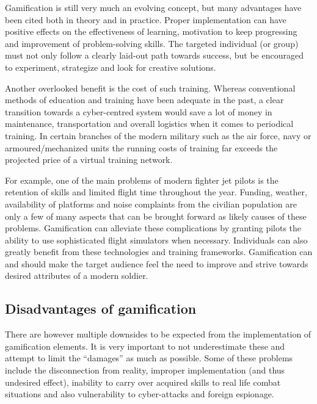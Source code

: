 \documentclass[10pt,twoside,slovak,a4paper]{article}
\begin{document}
Gamification is still very much an evolving concept, but many advantages have been cited both in theory and in practice. Proper implementation can have positive effects on the effectiveness of learning, motivation to keep progressing and improvement of problem-solving skills. The targeted individual (or group) must not only follow a clearly laid-out path towards success, but be encouraged to experiment, strategize and look for creative solutions\cite{tomcho2019motivating}.
\par Another overlooked benefit is the cost of such training. Whereas conventional methods of education and training have been adequate in the past, a clear transition towards a cyber-centred system would save a lot of money in maintenance, transportation and overall logistics when it comes to periodical training\cite{fletcher2000overview}. In certain branches of the modern military such as the air force, navy or armoured/mechanized units the running costs of training far exceeds the projected price of a virtual training network. 
\par For example, one of the main problems of modern fighter jet pilots is the retention of skills\cite{noh2020gamification} and limited flight time throughout the year. Funding, weather, availability of platforms and noise complaints from the civilian population are only a few of many aspects that can be brought forward as likely causes of these problems. Gamification can alleviate these complications by granting pilots the ability to use sophisticated flight simulators when necessary.
Individuals can also greatly benefit from these technologies and training frameworks. Gamification can and should make the target audience feel the need to improve and strive towards desired attributes of a modern soldier.




\subsection{Disadvantages of gamification} \label{disadvantages}

There are however multiple downsides to be expected from the implementation of gamification elements. It is very important to not underestimate these and attempt to limit the “damages” as much as possible. 
Some of these problems include the disconnection from reality, improper implementation (and thus undesired effect), inability to carry over acquired skills to real life combat situations and also vulnerability to cyber-attacks and foreign espionage.
\end{document}
